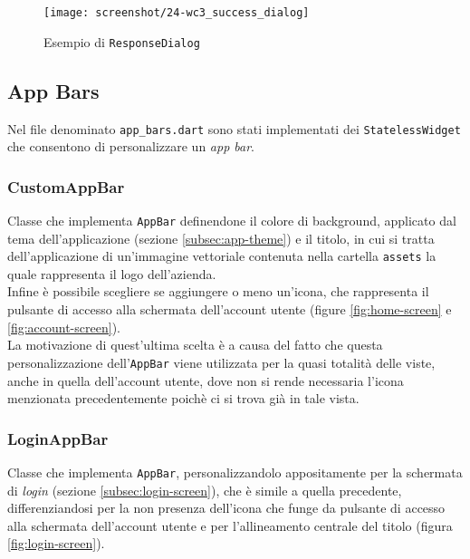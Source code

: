 \begin{figure}[!h] 
    \centering 
    \texttt{[image: screenshot/24-wc3\_success\_dialog]} 
    \caption{Esempio di \lstinline{ResponseDialog}}
    \label{fig:response-dialog}
\end{figure}

\subsection{App Bars}
\label{subsec:app-bars}

Nel file denominato \lstinline{app_bars.dart} sono stati implementati dei \lstinline{StatelessWidget} che consentono di personalizzare un \emph{app bar}.

\subsubsection*{CustomAppBar}
\label{subsubsec:custom-app-bar}

Classe che implementa \lstinline{AppBar}\cite{site:app-bar} definendone il colore di background, applicato dal tema dell'applicazione (sezione \ref{subsec:app-theme}) e il titolo, in cui si tratta dell'applicazione di un'immagine vettoriale contenuta nella cartella \lstinline{assets} la quale rappresenta il logo dell'azienda.\\
Infine è possibile scegliere se aggiungere o meno un'icona, che rappresenta il pulsante di accesso alla schermata dell'account utente (figure \ref{fig:home-screen} e \ref{fig:account-screen}).\\
La motivazione di quest'ultima scelta è a causa del fatto che questa personalizzazione dell'\lstinline{AppBar} viene utilizzata per la quasi totalità delle viste, anche in quella dell'account utente, dove non si rende necessaria l'icona menzionata precedentemente poichè ci si trova già in tale vista.

\subsubsection*{LoginAppBar}
\label{subsubsec:login-app-bar}

Classe che implementa \lstinline{AppBar}, personalizzandolo appositamente per la schermata di \emph{login} (sezione \ref{subsec:login-screen}), che è simile a quella precedente, differenziandosi per la non presenza dell'icona che funge da pulsante di accesso alla schermata dell'account utente e per l'allineamento centrale del titolo (figura \ref{fig:login-screen}).

